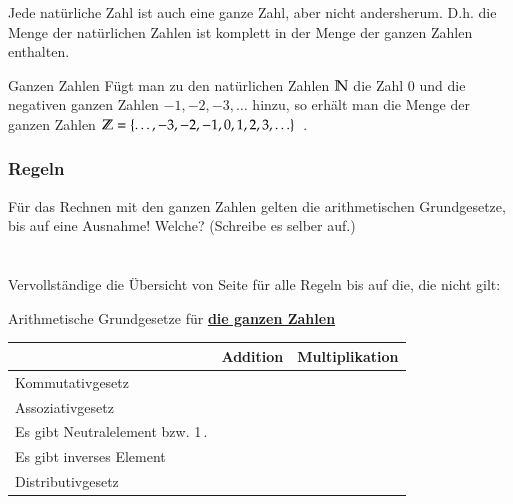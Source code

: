 Jede natürliche Zahl ist auch eine ganze Zahl, aber nicht andersherum.
D.h. die Menge der natürlichen Zahlen ist komplett in der Menge der ganzen Zahlen enthalten.

\vspace{1cm}
\begin{defn}{Ganzen Zahlen}
	Fügt man zu den natürlichen Zahlen $\mathbb{N}$ die Zahl 0 und die negativen ganzen Zahlen $-1, -2, -3,\ldots$ hinzu,
	so erhält man die Menge der ganzen Zahlen $\mathbb{Z} = \{ \ldots, -3, -2, -1, 0, 1, 2, 3, \ldots \}$\, .
\end{defn}


\subsubsection{Regeln}
Für das Rechnen mit den ganzen Zahlen gelten die arithmetischen Grundgesetze, bis auf eine Ausnahme!
Welche? (Schreibe es selber auf.)\\
\\~\\
Vervollständige die Übersicht von Seite \pageref{law:arithmetic} für alle Regeln bis auf die, die nicht gilt:
\begin{law}{Arithmetische Grundgesetze für \underline{\bfseries die ganzen Zahlen}}
    \bgroup
    \def\arraystretch{2.5}
	\begin{tabularx}{\linewidth}{|X|p{3.7cm}|p{3.7cm}|}
			\hline
			 & Addition & Multiplikation \\
			\hline
			Kommutativgesetz &  &  \\\hline
			Assoziativgesetz &  &  \\\hline
			Es gibt Neutralelement\newline 0 bzw. 1\,. &  &  \\\hline
			Es gibt inverses Element\newline~ & & \\
			\hline
			Distributivgesetz & \multicolumn{2}{c|}{} \\
			\hline
    \end{tabularx}
    \egroup
\end{law}

